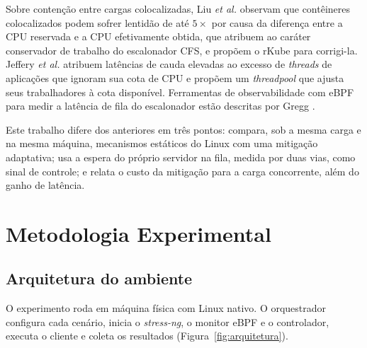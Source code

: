 \documentclass[12pt,a4paper]{article}
\begin{document}
Sobre contenção entre cargas colocalizadas, Liu \textit{et al.} \cite{liu2021gap} observam que contêineres
colocalizados podem sofrer lentidão de até $5\times$ por causa da diferença entre a CPU reservada e a CPU
efetivamente obtida, que atribuem ao caráter conservador de trabalho do escalonador CFS, e propõem o rKube para
corrigi-la. Jeffery \textit{et al.} \cite{jeffery2024tail} atribuem latências de cauda elevadas ao
excesso de \textit{threads} de aplicações que ignoram sua cota de CPU e propõem um \textit{threadpool} que
ajusta seus trabalhadores à cota disponível. Ferramentas de observabilidade com eBPF para medir a latência de
fila do escalonador estão descritas por Gregg \cite{gregg2019bpf}.

Este trabalho difere dos anteriores em três pontos: compara, sob a mesma carga e na mesma máquina, mecanismos
estáticos do Linux com uma mitigação adaptativa; usa a espera do próprio servidor na fila, medida por duas
vias, como sinal de controle; e relata o custo da mitigação para a carga concorrente, além do ganho de latência.

\section{Metodologia Experimental}

\subsection{Arquitetura do ambiente}
O experimento roda em máquina física com Linux nativo. O orquestrador configura cada cenário, inicia o
\textit{stress-ng}, o monitor eBPF e o controlador, executa o cliente e coleta os resultados
(Figura~\ref{fig:arquitetura}).
\end{document}
